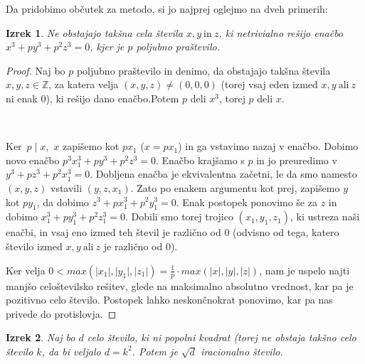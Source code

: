 \documentclass[a4paper, 10pt]{article}
\newtheorem{izr}{Izrek}
\newcommand{\abs}[1]{\ensuremath{\lvert #1 \rvert}}
\newcommand{\mth}[1]{\ensuremath{\mathbb{#1}}}
\newcommand{\Z}{\mth{Z}}
\begin{document}
Da pridobimo občutek za metodo, si jo najprej oglejmo na dveh primerih:
\newpage
\begin{izr}
Ne obstajajo takšna cela števila $x, y ~\text{in}~ z$, ki netrivialno rešijo enačbo $x^3 + py^3 + p^2z^3 = 0$, kjer je $p$ poljubno praštevilo.
\end{izr}

\begin{proof}
Naj bo $p$ poljubno praštevilo in denimo, da obstajajo takšna števila $x, y, z \in \Z$, za katera velja $(x, y, z) \neq (0,0,0)$ (torej vsaj eden izmed $x, y~\text{ali}~z$ ni enak $0$), ki rešijo dano enačbo.Potem $p$ deli $x^3$, torej $p$ deli $x$. 

$ $

Ker~$p\mid x$,~$x$ zapišemo kot $px_1$ ($x = px_1$) in ga vstavimo nazaj v enačbo. Dobimo novo enačbo $p^3x_1^3 + py^3 + p^2z^3 = 0$. Enačbo krajšamo s $p$ in jo preuredimo v $y^3 + pz^3 + p^2x_1^3 = 0$. Dobljena enačba je ekvivalentna začetni, le da smo namesto $(x, y, z)$ vstavili $(y, z, x_1)$. Zato po enakem argumentu kot prej, zapišemo $y$ kot $py_1$, da dobimo $z^3 + px_1^3 + p^2y_1^3 = 0$. Enak postopek ponovimo še za $z$ in dobimo $x_1^3 + py_1^3 + p^2z_1^3 = 0$.
Dobili smo torej trojico $(x_1, y_1, z_1)$, ki ustreza naši enačbi, in vsaj eno izmed teh števil je različno od $0$ (odvisno od tega, katero število izmed $x, y~\text{ali}~z$ je različno od $0$). 

Ker velja $0 < max(\abs{x_1}, \abs{y_1}, \abs{z_1}) = \frac{1}{p}\cdot max(\abs{x}, \abs{y}, \abs{z})$, nam je uspelo najti manjšo celoštevilsko rešitev, glede na maksimalno absolutno vrednost, kar pa je pozitivno celo število. Postopek lahko neskončnokrat ponovimo, kar pa nas privede do protislovja.
\end{proof}

\begin{izr}
Naj bo $d$ celo število, ki ni popolni kvadrat (torej ne obstaja takšno celo število $k$, da bi veljalo $d=k^2$. Potem je $\sqrt{d}$ iracionalno število.
\end{izr}
\end{document}
